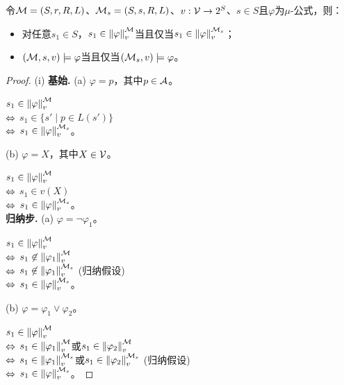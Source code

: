 \begin{lemma}\label{lem:ms}
	令${\cal M}=(S,r,R,L)$、${\cal M}_s = (S,s, R, L)$、$v:{\cal V} \rightarrow 2^S$、$s\in S$且$\varphi$为$\mu$-公式，则：
	\begin{itemize}
		\item[(i)] 对任意$s_1 \in S$，$s_1 \in \left\|\varphi\right\|_{v}^{{\cal M}}$当且仅当$s_1 \in \left\|\varphi\right\|_{v}^{{\cal M}_s}$；
		\item[(ii)] $({\cal M},s,v) \models \varphi$当且仅当$({\cal M}_s,v)\models \varphi$。
	\end{itemize}
\end{lemma}
\begin{proof}
	(i) \textbf{基始.} (a) $\varphi = p$，其中$p \in {\cal A}$。
	
	$s_1 \in \left\|\varphi\right\|_{v}^{{\cal M}}$\\
	$\Leftrightarrow$ $s_1 \in \{s' \mid p \in L(s')\}$\\
	$\Leftrightarrow$ $s_1 \in \left\|\varphi\right\|_{v}^{{\cal M}_s}$。
	
	(b) $\varphi = X$，其中$X\in {\cal V}$。
	
	$s_1 \in \left\|\varphi\right\|_{v}^{{\cal M}}$\\
	$\Leftrightarrow$ $s_1 \in v(X)$ \\
	$\Leftrightarrow$ $s_1 \in \left\|\varphi\right\|_{v}^{{\cal M}_s}$。\\
	
	
	\textbf{归纳步.} (a) $\varphi = \neg \varphi_1$。
	
	$s_1\in \left\|\varphi\right\|_{v}^{{\cal M}}$\\
	$\Leftrightarrow$ $s_1 \not \in \left\|\varphi_1\right\|_{v}^{{\cal M}}$\\
	$\Leftrightarrow$ $s_1 \not \in \left\|\varphi_1\right\|_{v}^{{\cal M}_s}$ \hfill (归纳假设)\\
	$\Leftrightarrow$ $s_1 \in \left\|\varphi\right\|_{v}^{{\cal M}_s}$。
	
	(b) $\varphi = \varphi_1 \vee \varphi_2$。
	
	$s_1 \in \left\|\varphi\right\|_{v}^{{\cal M}}$\\
	$\Leftrightarrow$  $s_1 \in \left\|\varphi_1\right\|_{v}^{{\cal M}}$或$s_1 \in \left\|\varphi_2\right\|_{v}^{{\cal M}}$\\
	$\Leftrightarrow$  $s_1 \in \left\|\varphi_1\right\|_{v}^{{\cal M}_s}$或$s_1 \in \left\|\varphi_2\right\|_{v}^{{\cal M}_s}$ \hfill (归纳假设)\\
	$\Leftrightarrow$ $s_1 \in \left\|\varphi\right\|_{v}^{{\cal M}_s}$。
	

\end{proof}
